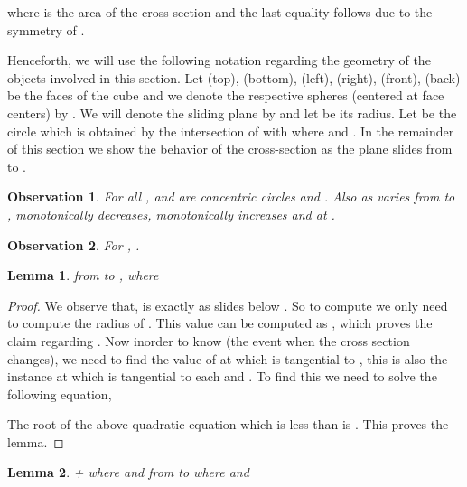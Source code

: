 \documentclass[conference]{IEEEtran}
\newtheorem{observation}{Observation}
\newtheorem{lemma}{Lemma}
\begin{document}
where  is the area of the cross section and the last equality follows due to the 
symmetry of .

Henceforth, we will use the following notation regarding the geometry of
the objects involved in this section. Let (top), (bottom), (left), (right),
(front), (back) be the faces of the cube and  we denote the respective spheres (centered at face centers) 
by . We will denote the sliding plane by  and let  be its radius. Let  be the circle which is obtained by the intersection of  with  where  and . In the remainder of this section we show the behavior of the cross-section as the plane  slides from  to .

\begin{observation}
 For all ,  and  are concentric circles and .
Also as  varies from  to ,  monotonically decreases,  monotonically increases and  at
.
\end{observation}

\begin{observation}
For , .
\end{observation}

\begin{lemma}
 from  to , where 
\end{lemma}
\begin{proof}
We observe that,  is exactly  as  slides below . So to compute  we only need to compute 
the radius  of . This value can be computed as
, which proves the claim regarding . Now inorder to know  (the event
when the cross section changes), we need to find the value of  at which  is tangential to , this is also
the instance at which  is tangential to each  and . To find this  we need to solve the
following equation, 
\small

The root of the above quadratic equation which is less than  is . This proves the lemma.
\end{proof}


\begin{lemma}
  
+  
 where  and  from  to  where 
 and 
\end{lemma}
\end{document}
